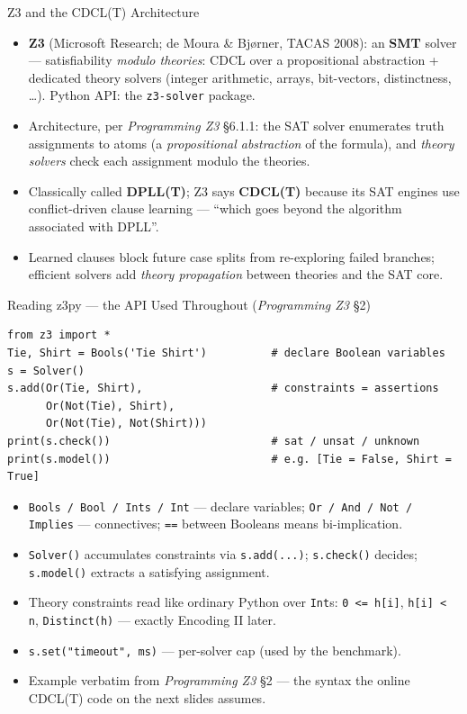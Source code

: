 \documentclass[10pt,aspectratio=169,xcolor={table}]{beamer}
\begin{document}
\begin{frame}{Z3 and the CDCL(T) Architecture}
  \begin{itemize}\itemsep3pt
    \item \textbf{Z3} (Microsoft Research; de Moura \& Bj{\o}rner,
          TACAS 2008): an \textbf{SMT} solver --- satisfiability
          \emph{modulo theories}: CDCL over a propositional
          abstraction + dedicated theory solvers (integer
          arithmetic, arrays, bit-vectors, distinctness, \dots).
          Python API: the \texttt{z3-solver} package.
    \item Architecture, per \emph{Programming Z3} \S6.1.1: the SAT
          solver enumerates truth assignments to atoms (a
          \emph{propositional abstraction} of the formula), and
          \emph{theory solvers} check each assignment modulo the
          theories.
    \item Classically called \textbf{DPLL(T)}; Z3 says
          \textbf{CDCL(T)} because its SAT engines use
          conflict-driven clause learning --- ``which goes beyond
          the algorithm associated with DPLL''.
    \item Learned clauses block future case splits from
          re-exploring failed branches; efficient solvers add
          \emph{theory propagation} between theories and the SAT
          core.
  \end{itemize}
\end{frame}

\begin{frame}[fragile]{Reading z3py --- the API Used Throughout (\emph{Programming Z3} \S2)}
\begin{lstlisting}[style=py]
from z3 import *
Tie, Shirt = Bools('Tie Shirt')          # declare Boolean variables
s = Solver()
s.add(Or(Tie, Shirt),                    # constraints = assertions
      Or(Not(Tie), Shirt),
      Or(Not(Tie), Not(Shirt)))
print(s.check())                         # sat / unsat / unknown
print(s.model())                         # e.g. [Tie = False, Shirt = True]
\end{lstlisting}
  \begin{itemize}\itemsep1pt
    \item \texttt{Bools / Bool / Ints / Int} --- declare variables;
          \texttt{Or / And / Not / Implies} --- connectives;
          \texttt{==} between Booleans means bi-implication.
    \item \texttt{Solver()} accumulates constraints via
          \texttt{s.add(...)}; \texttt{s.check()} decides;
          \texttt{s.model()} extracts a satisfying assignment.
    \item Theory constraints read like ordinary Python over
          \texttt{Int}s: \texttt{0 <= h[i]}, \texttt{h[i] < n},
          \texttt{Distinct(h)} --- exactly Encoding II later.
    \item \texttt{s.set("timeout", ms)} --- per-solver cap (used by
          the benchmark).
    \item Example verbatim from \emph{Programming Z3} \S2 --- the
          syntax the online CDCL(T) code on the next slides assumes.
  \end{itemize}
\end{frame}
\end{document}
